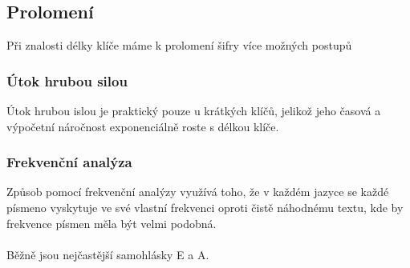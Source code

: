 \documentclass{article}
\begin{document}
\subsection{Prolomení}
Při znalosti délky klíče máme k prolomení šifry více možných postupů
\subsubsection{Útok hrubou silou}
Útok hrubou islou je praktický pouze u krátkých klíčů, jelikož jeho časová 
a výpočetní náročnost exponenciálně roste s délkou klíče.
\subsubsection{Frekvenční analýza}
Způsob pomocí frekvenční analýzy využívá toho, že v každém jazyce se každé 
písmeno vyskytuje ve své vlastní frekvenci oproti čistě náhodnému textu, kde
by frekvence písmen měla být velmi podobná.
\\\\
Běžně jsou nejčastější samohlásky E a A. 
\end{document}
